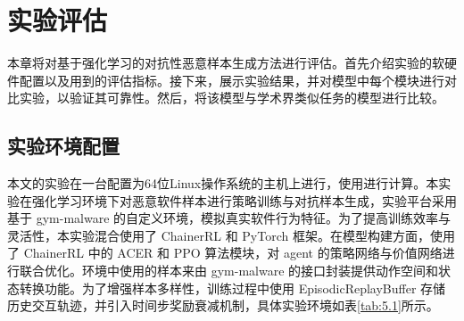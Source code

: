%
%
%
%
%

\chapter{实验评估}

本章将对基于强化学习的对抗性恶意样本生成方法进行评估。首先介绍实验的软硬件配置以及用到的评估指标。接下来，展示实验结果，并对模型中每个模块进行对比实验，以验证其可靠性。然后，将该模型与学术界类似任务的模型进行比较。


\section{实验环境配置}


本文的实验在一台配置为64位Linux操作系统的主机上进行，使用进行计算。本实验在强化学习环境下对恶意软件样本进行策略训练与对抗样本生成，实验平台采用基于 gym-malware 的自定义环境，模拟真实软件行为特征。为了提高训练效率与灵活性，本实验混合使用了 ChainerRL 和 PyTorch 框架。在模型构建方面，使用了 ChainerRL 中的 ACER 和 PPO 算法模块，对 agent 的策略网络与价值网络进行联合优化。环境中使用的样本来由 gym-malware 的接口封装提供动作空间和状态转换功能。为了增强样本多样性，训练过程中使用 EpisodicReplayBuffer 存储历史交互轨迹，并引入时间步奖励衰减机制，具体实验环境如表\ref{tab:5.1}所示。

